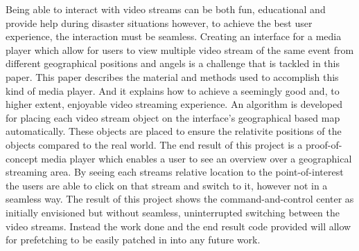 Being able to interact with video streams can be both fun, educational and provide help during disaster situations however, to achieve the best user experience, the interaction must be seamless. Creating an interface for a media player which allow for users to view multiple video stream of the same event from different geographical positions and angels is a challenge that is tackled in this paper. This paper describes the material and methods used to accomplish this kind of media player. And it explains how to achieve a seemingly good and, to higher extent, enjoyable video streaming experience. An algorithm is developed for placing each video stream object on the interface's geographical based map automatically. These objects are placed to ensure the relativite positions of the objects compared to the real world. The end result of this project is a proof-of-concept media player which enables a user to see an overview over a geographical streaming area. By seeing each streams relative location to the point-of-interest the users are able to click on that stream and switch to it, however not in a seamless way. The result of this project shows the command-and-control center as initially envisioned but without seamless, uninterrupted switching between the video streams. Instead the work done and the end result code provided will allow for prefetching to be easily patched in into any future work.